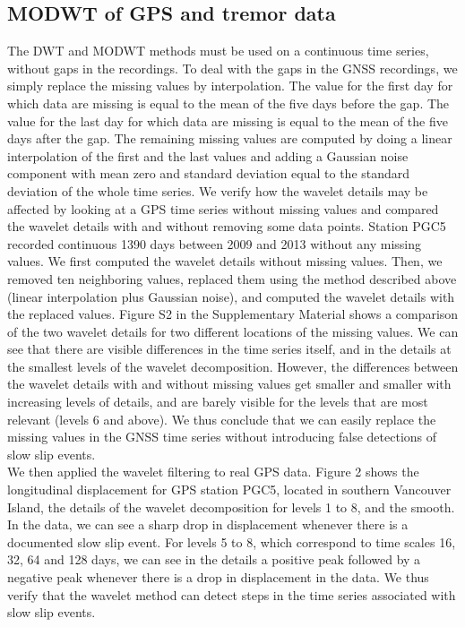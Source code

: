 \documentclass{article}
\begin{document}
\subsection{MODWT of GPS and tremor data}

The DWT and MODWT methods must be used on a continuous time series, without gaps in the recordings. To deal with the gaps in the GNSS recordings, we simply replace the missing values by interpolation. The value for the first day for which data are missing is equal to the mean of the five days before the gap. The value for the last day for which data are missing is equal to the mean of the five days after the gap. The remaining missing values are computed by doing a linear interpolation of the first and the last values and adding a Gaussian noise component with mean zero and standard deviation equal to the standard deviation of the whole time series. We verify how the wavelet details may be affected by looking at a GPS time series without missing values and compared the wavelet details with and without removing some data points. Station PGC5 recorded continuous 1390 days between 2009 and 2013 without any missing values. We first computed the wavelet details without missing values. Then, we removed ten neighboring values, replaced them using the method described above (linear interpolation plus Gaussian noise), and computed the wavelet details with the replaced values. Figure S2 in the Supplementary Material shows a comparison of the two wavelet details for two different locations of the missing values. We can see that there are visible differences in the time series itself, and in the details at the smallest levels of the wavelet decomposition. However, the differences between the wavelet details with and without missing values get smaller and smaller with increasing levels of details, and are barely visible for the levels that are most relevant (levels 6 and above). We thus conclude that we can easily replace the missing values in the GNSS time series without introducing false detections of slow slip events. \\

We then applied the wavelet filtering to real GPS data. Figure 2 shows the longitudinal displacement for GPS station PGC5, located in southern Vancouver Island, the details of the wavelet decomposition for levels 1 to 8, and the smooth. In the data, we can see a sharp drop in displacement whenever there is a documented slow slip event. For levels 5 to 8, which correspond to time scales 16, 32, 64 and 128 days, we can see in the details a positive peak followed by a negative peak whenever there is a drop in displacement in the data. We thus verify that the wavelet method can detect steps in the time series associated with slow slip events. \\
\end{document}
